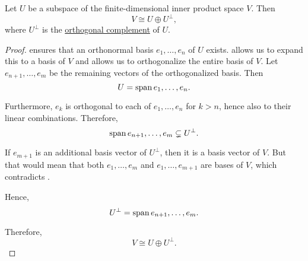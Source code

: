\begin{proposition}\label{thm:direct_sum_with_orthogonal_complement}
  Let \( U \) be a subspace of the finite-dimensional inner product space \( V \). Then
  \begin{equation*}
    V \cong U \oplus U^\perp,
  \end{equation*}
  where \( U^\perp \) is the \hyperref[def:orthogonal_complement]{orthogonal complement} of \( U \).
\end{proposition}
\begin{proof}
   ensures that an orthonormal basis \( e_1, \ldots, e_n \) of \( U \) exists.  allows us to expand this to a basis of \( V \) and  allows us to orthogonalize the entire basis of \( V \). Let \( e_{n+1}, \ldots, e_m \) be the remaining vectors of the orthogonalized basis. Then
  \begin{equation*}
    U = \operatorname{span}{ e_1, \ldots, e_n }.
  \end{equation*}

  Furthermore, \( e_k \) is orthogonal to each of \( e_1, \ldots, e_n \) for \( k > n \), hence also to their linear combinations. Therefore,
  \begin{equation*}
    \operatorname{span}{ e_{n+1}, \ldots, e_m } \subsetneq U^\perp.
  \end{equation*}

  If \( e_{m+1} \) is an additional basis vector of \( U^\perp \), then it is a basis vector of \( V \). But that would mean that both \( e_1, \ldots, e_m \) and \( e_1, \ldots, e_{m+1} \) are bases of \( V \), which contradicts .

  Hence,
  \begin{equation*}
    U^\perp = \operatorname{span}{ e_{n+1}, \ldots, e_m }.
  \end{equation*}

  Therefore,
  \begin{equation*}
    V \cong U \oplus U^\perp.
  \end{equation*}
\end{proof}


